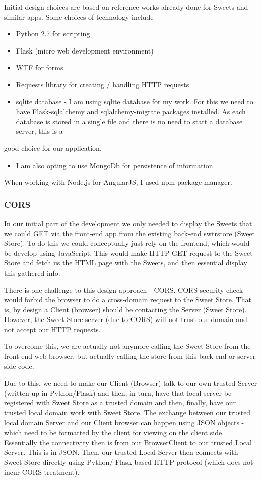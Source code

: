 \documentclass[11pt]{article}
\begin{document}
Initial design choices are based on reference works already done for
Sweets and similar apps. Some choices of technology include
\begin{itemize}
\item Python 2.7 for scripting
\item Flask (micro web development environment)
\item WTF for forms
\item Requests library for creating / handling HTTP requests
\item sqlite database - I am using sqlite database for my work. For this
  we need to have Flask-sqlalchemy and sqlalchemy-migrate packages
  installed. As each database is stored in a single file and there is no need to start a database server, this is a
\end{itemize}
good choice for our application.
\begin{itemize}
\item I am also opting to use MongoDb for persistence of information.
\end{itemize}

When working with Node.js for AngularJS, I used npm package manager.
\subsubsection{CORS}
\label{sec-3-3-1}

In our initial part of the development we only needed to display the
Sweets that we could GET via the front-end app from the existing
back-end swtrstore (Sweet Store). To do this we could conceptually just rely on the frontend, which would be
develop using JavaScript. This would make HTTP GET request to the
Sweet Store and fetch us the HTML page with the Sweets, and then
essential display this gathered info.

There is one challenge to this design approach - CORS. CORS security
check would forbid the browser to do a cross-domain request to the
Sweet Store. That is, by design a Client (browser) should be
contacting the Server (Sweet Store). However, the Sweet Store server
(due to CORS) will not trust our domain and not accept our HTTP
requests. 

To overcome this, we are actually not anymore calling the Sweet Store
from the front-end web browser, but actually calling the store from
this back-end or server-side code. 

Due to this, we need to make our Client (Browser) talk to
our own trusted Server (written up in Python/Flask) and then, in turn,
have that local server be registered with Sweet Store as a trusted
domain and then, finally, have our trusted local domain work with Sweet
Store. The exchange between our trusted local domain Server and our
Client browser can happen using JSON objects - which need to be
formatted by the client for viewing on the client side. Essentially
the connectivity then is from our BrowserClient to our trusted Local
Server. This is in JSON. Then, our trusted Local Server then connects
with Sweet Store directly using Python/ Flask based HTTP protocol
(which does not incur CORS treatment). 
\end{document}
